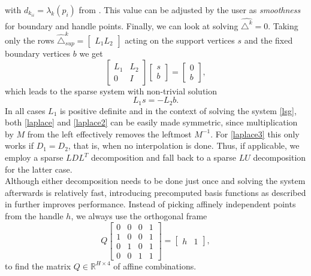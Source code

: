 \documentclass[twocolumn]{article}
\begin{document}
with $d_{k_{ii}} = \lambda_k(p_i)$ from \cite{botsch2004intuitive}.
This value can be adjusted by the user as \textit{smoothness} for boundary and handle points.
Finally, we can look at solving $\hat{\triangle^k} = 0$. Taking only the rows $\hat{\triangle}^k_{sup} = \begin{bmatrix}L_1 L_2\end{bmatrix}$ acting on the support vertices $s$ and the fixed boundary vertices $b$ we get
\begin{equation*}
\begin{bmatrix}L_1 & L_2 \\ 0 & I\end{bmatrix} \begin{bmatrix}s \\ b\end{bmatrix} = \begin{bmatrix} 0 \\ b \end{bmatrix},
\end{equation*}
which leads to the sparse system with non-trivial solution
\begin{equation}\label{lsg}
L_1 s = -L_2 b.
\end{equation}
In all cases $L_1$ is positive definite and in the context of solving the system \eqref{lsg}, both \eqref{laplace} and \eqref{laplace2} can be easily made symmetric, since multiplication by $M$ from the left effectively removes the leftmost $M^{-1}$. For \eqref{laplace3} this only works if $D_1 = D_2$, that is, when no interpolation is done. Thus, if applicable, we employ a sparse $LDL^T$ decomposition and fall back to a sparse $LU$ decomposition for the latter case. \\
Although either decomposition needs to be done just once and solving the system afterwards is relatively fast, introducing precomputed basis functions as described in \cite{botsch2004intuitive} further improves performance.
Instead of picking affinely independent points from the handle $h$, we always use the orthogonal frame
\[
Q\begin{bmatrix}0 & 0 & 0 & 1 \\ 1 & 0 & 0 & 1 \\ 0 & 1 & 0 & 1 \\ 0 & 0 & 1 & 1\end{bmatrix} = \begin{bmatrix} h & 1 \end{bmatrix},
\]
to find the matrix $Q \in \mathbb{R}^{H \times 4}$ of affine combinations.
\end{document}
